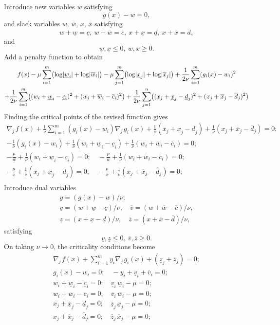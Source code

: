 \documentclass[11pt,a4paper]{article}
\newcommand{\unl}[1]{{\ \!\underline{\;\!\!#1\;\!\!}\ \!}}
\renewcommand{\unl}[1]{{\underline{#1}}}
\newcommand{\ovl}[1]{{\bar{#1}}}
\renewcommand{\ovl}[1]{{\overline{#1}}}
\newcommand{\cl}{{\underline{c}}}
\newcommand{\dl}{{\underline{d}}}
\newcommand{\vl}{{\unl{v}}}
\newcommand{\wl}{{\unl{w}}}
\newcommand{\xl}{{\unl{x}}}
\newcommand{\zl}{{\unl{z}}}
\newcommand{\cu}{{\overline{c}}}
\newcommand{\du}{{\overline{d}}}
\newcommand{\vu}{{\ovl{v}}}
\newcommand{\wu}{{\ovl{w}}}
\newcommand{\xu}{{\ovl{x}}}
\newcommand{\zu}{{\ovl{z}}}
\newcommand{\w}{w}
\newcommand{\x}{x}
\newcommand{\nablaj}{\nabla_{\!j\,}}
\begin{document}
Introduce new variables $w$ satisfying
\[ g(\x) - \w = 0 , \]
and slack variables $\wl$, $\wu$, $\xl$, $\xu$ satisfying
\[ \w+\wl=\cl,\ \w+\wu=\cu,\ \x+\xl=\dl,\ \x+\xu=\du,\]
and
\[ \wl,\xl\leq 0,\ \wu,\xu\geq 0 . \]
Add a penalty function to obtain
\begin{multline*} f(x) - \mu \sum_{i=1}^{m}\bigl(\log\!|\wl_i|+\log\!|\wu_i|\bigr) - \mu \sum_{j=1}^{m}\bigl(\log\!|\xl_j|+\log\!|\xu_j|\bigr) + \frac{1}{2\nu} \sum_{i=1}^{m}(g_i(x)-w_i)^2 \\
    \hspace*{\fill} + \frac{1}{2\nu} \sum_{i=1}^{m}\bigl((\w_i+\wl_i-\cl_i)^2+(\w_i+\wu_i-\cu_i)^2\bigr) + \frac{1}{2\nu} \sum_{j=1}^{n}\bigl((\x_j+\xl_j-\dl_j)^2+(\x_j+\xu_j-\du_j)^2\bigr) \end{multline*}
Finding the critical points of the revised function gives
\[ \begin{gathered}
      \nablaj{f}(x) + \frac{1}{\nu} \sum_{i=1}^{m}(g_i(x)-w_i) \nablaj{g_i}(x) + \frac{1}{\nu}(\x_j+\xl_j-\dl_j)+\frac{1}{\nu}(\x_j+\xu_j-\du_j)= 0; \\
      -\frac{1}{\nu}(g_i(x)-w_i) + \frac{1}{\nu}(\w_i+\wl_i-\cl_i) + \frac{1}{\nu}(\w_i+\wu_i-\cu_i) = 0; \\
      -\frac{\mu}{\wl} + \frac{1}{\nu}(\w_i+\wl_i-\cl_i) = 0; \quad -\frac{\mu}{\wu} + \frac{1}{\nu}(\w_i+\wu_i-\cu_i) = 0; \\
       -\frac{\mu}{\xl} + \frac{1}{\nu}(\x_j+\xl_j-\dl_j) = 0; \quad -\frac{\mu}{\xu} + \frac{1}{\nu}(\x_j+\xu_j-\du_j) = 0; \\
   \end{gathered} \]
Introduce dual variables
\[ \begin{gathered} y = (g(x)-w)/\nu; \\ \vl=(\w+\wl-\cl)/\nu, \quad \vu=(\w+\wu-\cu)/\nu, \\ \zl=(\x+\xl-\dl)/\nu, \quad \zu=(\x+\xu-\du)/\nu,  \end{gathered} \]
satisfying
\[ \vl,\zl\leq 0,\ \vu,\zu\geq 0 . \]
On taking $\nu\to0$, the criticality conditions become
\[ \begin{gathered}
      \nablaj{f}(x) + \sum_{i=1}^{m} y_i \nablaj{g_i}(x) + (\zl_j+\zu_j) = 0; \\
      g_i(x) - w_i = 0; \quad -y_i + \vl_i + \vu_i = 0; \\
      \w_i+\wl_i-\cl_i = 0; \quad \vl_i\,\wl_i - \mu = 0; \\
      \w_i+\wu_i-\cu_i = 0; \quad \vu_i\,\wu_i - \mu = 0; \\
      \x_j+\xl_j-\dl_j = 0; \quad \zl_j\,\xl_j - \mu = 0; \\
      \x_j+\xu_j-\du_j = 0; \quad \zu_j\,\xu_j - \mu = 0;
   \end{gathered} \]
\end{document}
